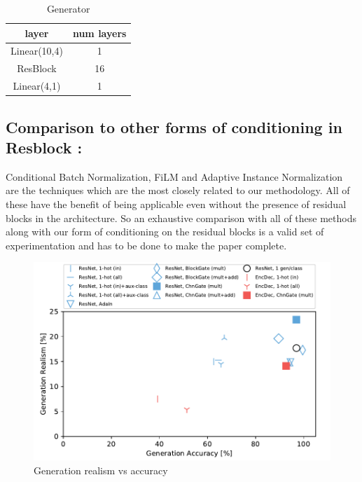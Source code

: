 \begin{table}[ht]
\caption{Generator} %
\centering %
\begin{tabular}{c c} %
\hline\hline %
layer & num layers\\%
\hline %
Linear(10,4) & 1\\ %
ResBlock & 16 \\
Linear(4,1) & 1 \\
\hline %
\end{tabular}
\label{table:1d_G} %
\end{table}


\subsection{Comparison to other forms of conditioning in Resblock :}
Conditional Batch Normalization, FiLM and Adaptive Instance Normalization are the techniques which are the most closely related to our methodology. All of these have the benefit of being applicable even without the presence of residual blocks in the architecture. So an exhaustive comparison with all of these methods along with our form of conditioning on the residual blocks is a valid set of experimentation and has to be done to make the paper complete.

\begin{figure}
    \centering
    \includegraphics[width=\linewidth]{paper_images/gen_real_vs_acc.pdf}
    \caption{Generation realism vs accuracy}\label{fig:conditioning_amt}
\end{figure}

